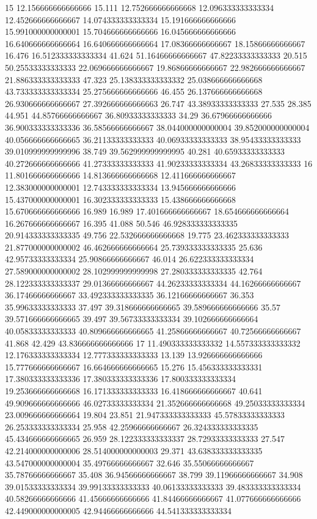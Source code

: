 15 12.156666666666666 15.111 12.752666666666668 12.096333333333334 12.452666666666667 14.074333333333334 15.191666666666666 15.991000000000001 15.704666666666666 16.045666666666666 16.640666666666664 16.640666666666664 17.08366666666667 18.15866666666667 16.476 16.512333333333334 41.624 51.16466666666667 47.82233333333333 20.515 50.25533333333333 22.069666666666667 19.86866666666667 22.982666666666667 21.886333333333333 47.323 25.138333333333332 25.038666666666668 43.733333333333334 25.275666666666666 46.455 26.137666666666668 26.930666666666667 27.392666666666663 26.747 43.38933333333333 27.535 28.385 44.951 44.85766666666667 36.80933333333333 34.29 36.67966666666666 36.900333333333336 36.58566666666667 38.044000000000004 39.852000000000004 40.056666666666665 36.21133333333333 40.06933333333333 38.95433333333333 39.010999999999996 38.749 39.562999999999995 40.281 40.65933333333333 40.272666666666666 41.27333333333333 41.90233333333334 43.26833333333333
16 11.801666666666666 14.813666666666668 12.411666666666667 12.383000000000001 12.743333333333334 13.945666666666666 15.437000000000001 16.302333333333333 15.438666666666668 15.670666666666666 16.989 16.989 17.401666666666667 18.654666666666664 16.267666666666667 16.395 41.088 50.546 46.928333333333335 20.914333333333335 49.756 22.532666666666668 19.775 23.462333333333333 21.877000000000002 46.462666666666664 25.739333333333335 25.636 42.95733333333334 25.90866666666667 46.014 26.622333333333334 27.589000000000002 28.102999999999998 27.280333333333335 42.764 28.122333333333337 29.01366666666667 44.26233333333334 44.16266666666667 36.17466666666667 33.492333333333335 36.12166666666667 36.353 35.99633333333333 37.497 39.318666666666665 39.589666666666666 35.57 39.571666666666665 39.497 39.56733333333334 39.102666666666664 40.05833333333333 40.809666666666665 41.25866666666667 40.72566666666667 41.868 42.429 43.836666666666666
17 11.490333333333332 14.557333333333332 12.176333333333334 12.777333333333333 13.139 13.926666666666666 15.777666666666667 16.664666666666665 15.276 15.456333333333331 17.380333333333336 17.380333333333336 17.800333333333334 19.253666666666668 16.171333333333333 16.418666666666667 40.641 49.909666666666666 46.02733333333334 21.352666666666668 49.25033333333334 23.009666666666664 19.804 23.851 21.947333333333333 45.57833333333333 26.253333333333334 25.958 42.25966666666667 26.324333333333335 45.434666666666665 26.959 28.122333333333337 28.72933333333333 27.547 42.214000000000006 28.514000000000003 29.371 43.638333333333335 43.547000000000004 35.49766666666667 32.646 35.55066666666667 35.78766666666667 35.408 36.94566666666667 38.799 39.11966666666667 34.908 39.01533333333334 39.99133333333333 40.06133333333333 39.483333333333334 40.58266666666666 41.45666666666666 41.84466666666667 41.077666666666666 42.449000000000005 42.94466666666666 44.541333333333334
